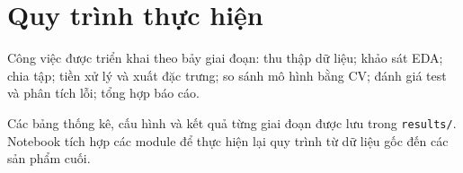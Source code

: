 \section{Quy trình thực hiện}
\label{sec:B_2}
Công việc được triển khai theo bảy giai đoạn: thu thập dữ liệu; khảo sát EDA; chia tập; tiền xử lý và xuất đặc trưng; so sánh mô hình bằng CV; đánh giá test và phân tích lỗi; tổng hợp báo cáo.

Các bảng thống kê, cấu hình và kết quả từng giai đoạn được lưu trong \texttt{results/}. Notebook tích hợp các module để thực hiện lại quy trình từ dữ liệu gốc đến các sản phẩm cuối.
